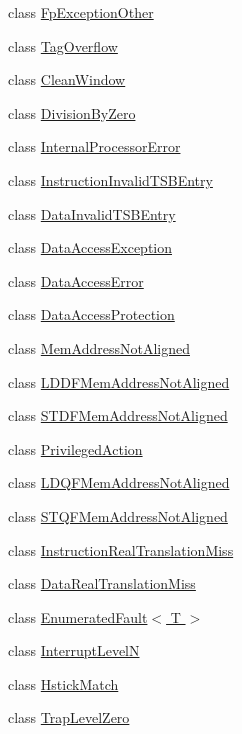 \begin{DoxyCompactItemize}
class \hyperlink{classSparcISA_1_1FpExceptionOther}{FpExceptionOther}
\item 
class \hyperlink{classSparcISA_1_1TagOverflow}{TagOverflow}
\item 
class \hyperlink{classSparcISA_1_1CleanWindow}{CleanWindow}
\item 
class \hyperlink{classSparcISA_1_1DivisionByZero}{DivisionByZero}
\item 
class \hyperlink{classSparcISA_1_1InternalProcessorError}{InternalProcessorError}
\item 
class \hyperlink{classSparcISA_1_1InstructionInvalidTSBEntry}{InstructionInvalidTSBEntry}
\item 
class \hyperlink{classSparcISA_1_1DataInvalidTSBEntry}{DataInvalidTSBEntry}
\item 
class \hyperlink{classSparcISA_1_1DataAccessException}{DataAccessException}
\item 
class \hyperlink{classSparcISA_1_1DataAccessError}{DataAccessError}
\item 
class \hyperlink{classSparcISA_1_1DataAccessProtection}{DataAccessProtection}
\item 
class \hyperlink{classSparcISA_1_1MemAddressNotAligned}{MemAddressNotAligned}
\item 
class \hyperlink{classSparcISA_1_1LDDFMemAddressNotAligned}{LDDFMemAddressNotAligned}
\item 
class \hyperlink{classSparcISA_1_1STDFMemAddressNotAligned}{STDFMemAddressNotAligned}
\item 
class \hyperlink{classSparcISA_1_1PrivilegedAction}{PrivilegedAction}
\item 
class \hyperlink{classSparcISA_1_1LDQFMemAddressNotAligned}{LDQFMemAddressNotAligned}
\item 
class \hyperlink{classSparcISA_1_1STQFMemAddressNotAligned}{STQFMemAddressNotAligned}
\item 
class \hyperlink{classSparcISA_1_1InstructionRealTranslationMiss}{InstructionRealTranslationMiss}
\item 
class \hyperlink{classSparcISA_1_1DataRealTranslationMiss}{DataRealTranslationMiss}
\item 
class \hyperlink{classSparcISA_1_1EnumeratedFault}{EnumeratedFault$<$ T $>$}
\item 
class \hyperlink{classSparcISA_1_1InterruptLevelN}{InterruptLevelN}
\item 
class \hyperlink{classSparcISA_1_1HstickMatch}{HstickMatch}
\item 
class \hyperlink{classSparcISA_1_1TrapLevelZero}{TrapLevelZero}

\end{DoxyCompactItemize}
